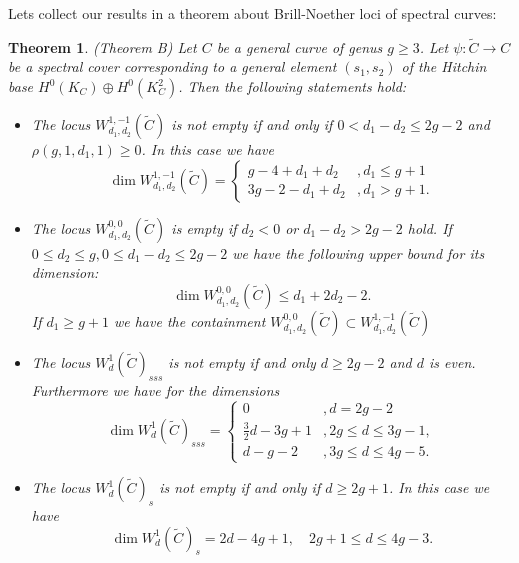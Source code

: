 \documentclass[12pt]{extarticle}
\newtheorem{theorem}{Theorem}
\theoremstyle{definition}
\numberwithin{theorem}{section}
\renewcommand{\tilde}{\widetilde}		%
\begin{document}
Lets collect our results in a theorem about Brill-Noether loci of spectral curves:
\begin{theorem}\label{thm:bn_strata}(Theorem B) Let $C$ be a general curve of genus $g\geq 3$. Let $\psi: \tilde{C} \to C$ be a spectral cover corresponding to a general element $(s_1,s_2)$ of the Hitchin base $H^0(K_C)\oplus H^0(K_C^2)$. Then the following statements hold:
\begin{itemize}
\item[(i)] The locus $W^{1,-1}_{d_1,d_2}(\tilde{C})$ is not empty if and only if $0 < d_1 - d_2 \leq 2g-2$ and $\rho(g,1,d_1,1) \geq 0$. In this case we have 
\begin{equation*}
\dim W^{1,-1}_{d_1,d_2}(\tilde{C}) = 
\begin{cases}
g-4 + d_1 + d_2 &,d_1 \leq g+1\\
3g - 2- d_1 + d_2  &, d_1 > g+1.
\end{cases}
\end{equation*} 
\item[(ii)] The locus $W^{0,0}_{d_1,d_2}(\tilde{C})$ is empty if $d_2 < 0$ or $d_1 - d_2 > 2g-2$ hold. If $0 \leq d_2 \leq g, 0\leq d_1 - d_2 \leq 2g-2$ we have the following upper bound for its dimension:
\begin{equation}
\dim W^{0,0}_{d_1,d_2}(\tilde{C}) \leq d_1 + 2d_2 -2.
\end{equation}
If $d_1 \geq g+1$ we have the containment $W^{0,0}_{d_1,d_2}(\tilde{C}) \subset W^{1,-1}_{d_1,d_2}(\tilde{C})$
\item[(iii)] The locus $W^1_d(\tilde{C})_{sss}$ is not empty if and only $d\geq 2g-2$ and $d$ is even. Furthermore we have for the dimensions
\begin{equation*}
\dim W^1_d(\tilde{C})_{sss} = \begin{cases}
0 &,d=2g-2\\
\frac{3}{2}d - 3g +1&,2g\leq d \leq 3g-1,\\
d - g -2&,3g \leq d \leq 4g-5.
\end{cases}
\end{equation*}
\item[(iv)] The locus $W^1_d(\tilde{C})_{s}$ is not empty if and only if $d\geq 2g+1$. In this case we have 
\begin{equation*}
\dim W^1_d(\tilde{C})_{s} = 2d -4g +1,\quad 2g+1 \leq d \leq 4g-3.
\end{equation*}
\end{itemize}
\end{theorem}
\end{document}
